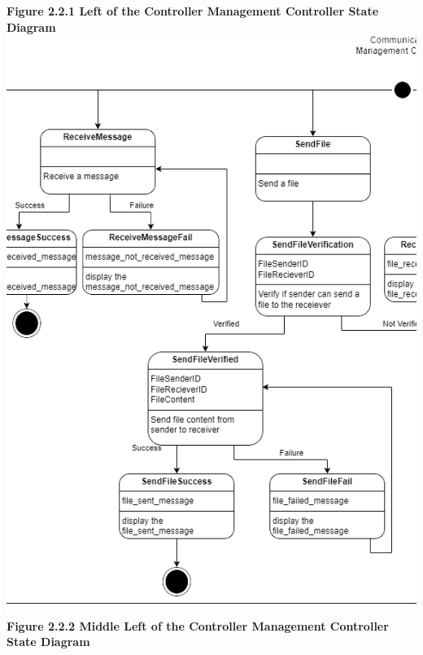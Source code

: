 \documentclass[]{article}
\begin{document}
\begin{center}
\textbf{Figure 2.2.1 Left of the Controller Management Controller State Diagram}
\includegraphics{../images/ControllerStateDiagrams/CMC2.png}\\
\textbf{Figure 2.2.2 Middle Left of the Controller Management Controller State Diagram}

\end{center}
\end{document}
